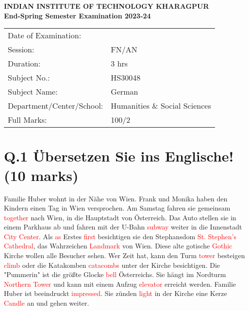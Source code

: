 \documentclass[a4paper,12pt]{article}
\begin{document}
\begin{center}
    \textbf{INDIAN INSTITUTE OF TECHNOLOGY KHARAGPUR}\\
    \textbf{End-Spring Semester Examination 2023-24}\\
    \vspace{0.5cm}
    \begin{tabular}{l l}
        Date of Examination: & \hspace{2cm} \\
        Session: & FN/AN \\
        Duration: & 3 hrs \\
        Subject No.: & HS30048 \\
        Subject Name: & German \\
        Department/Center/School: & Humanities \& Social Sciences \\
        Full Marks: & 100/2 \\
    \end{tabular}
\end{center}

\vspace{1cm}

\section*{Q.1 Übersetzen Sie ins Englische! (10 marks)}

Familie Huber wohnt in der Nähe von Wien. Frank und Monika haben den Kindern einen Tag in Wien versprochen. Am Samstag fahren sie gemeinsam \textcolor{red}{together} nach Wien, in die Hauptstadt von Österreich. Das Auto stellen sie in einem Parkhaus ab und fahren mit der U-Bahn \textcolor{red}{subway} weiter in die Innenstadt \textcolor{red}{City Center}. Als \textcolor{red}{as} Erstes \textcolor{red}{first} besichtigen sie den Stephansdom \textcolor{red}{St. Stephen's Cathedral}, das Wahrzeichen \textcolor{red}{Landmark} von Wien. Diese alte gotische \textcolor{red}{Gothic} Kirche wollen alle Besucher sehen. Wer Zeit hat, kann den Turm \textcolor{red}{tower} besteigen \textcolor{red}{climb} oder die Katakomben \textcolor{red}{catacombs} unter der Kirche besichtigen. Die "Pummerin" ist die größte Glocke \textcolor{red}{bell} Österreichs. Sie hängt im Nordturm \textcolor{red}{Northern Tower} und kann mit einem Aufzug \textcolor{red}{elevator} erreicht werden. Familie Huber ist beeindruckt \textcolor{red}{impressed}. Sie zünden \textcolor{red}{light} in der Kirche eine Kerze \textcolor{red}{Candle} an und gehen weiter.
\end{document}
